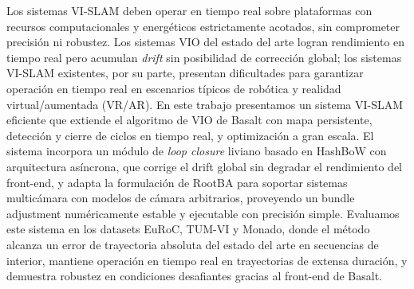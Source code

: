 

Los sistemas VI-SLAM deben operar en tiempo real sobre plataformas con recursos computacionales y energéticos estrictamente acotados, sin comprometer precisión ni robustez. Los sistemas VIO del estado del arte logran rendimiento en tiempo real pero acumulan \textit{drift} sin posibilidad de corrección global; los sistemas VI-SLAM existentes, por su parte, presentan dificultades para garantizar operación en tiempo real en escenarios típicos de robótica y realidad virtual/aumentada (VR/AR). En este trabajo presentamos un sistema VI-SLAM eficiente que extiende el algoritmo de VIO de Basalt con mapa persistente, detección y cierre de ciclos en tiempo real, y optimización a gran escala. El sistema incorpora un módulo de \textit{loop closure} liviano basado en HashBoW con arquitectura asíncrona, que corrige el drift global sin degradar el rendimiento del front-end, y adapta la formulación de RootBA para soportar sistemas multicámara con modelos de cámara arbitrarios, proveyendo un bundle adjustment numéricamente estable y ejecutable con precisión simple. Evaluamos este sistema en los datasets EuRoC, TUM-VI y Monado, donde el método alcanza un error de trayectoria absoluta del estado del arte en secuencias de interior, mantiene operación en tiempo real en trayectorias de extensa duración, y demuestra robustez en condiciones desafiantes gracias al front-end de Basalt.

